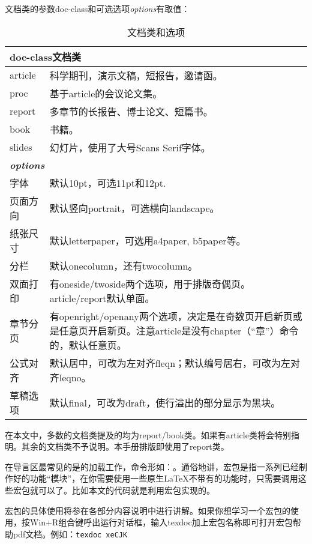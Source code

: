 文档类的参数doc-class和可选选项{\textit{options}}有取值：
\begin{table}[!htb]
    \centering
	\caption{文档类和选项}
	\label{tab:documentclass}
	\begin{tabular}{p{5em} @{\ -\ } p{24em}}
		\hline
		\multicolumn{2}{l}{\bfseries doc-class文档类\footnotemark} \\
		\hline
		article   & 科学期刊，演示文稿，短报告，邀请函。\\
		proc      & 基于article的会议论文集。\\
		report    & 多章节的长报告、博士论文、短篇书。\\
		book      & 书籍。\\
		slides    & 幻灯片，使用了大号Scans Serif字体。\\
		\hline
		\multicolumn{2}{l}{\bfseries\itshape options} \\
		\hline
		字体     & 默认10pt，可选11pt和12pt.\\
		页面方向 & 默认竖向portrait，可选横向landscape。\\
		纸张尺寸 & 默认letterpaper，可选用a4paper, b5paper等。\\
		分栏     & 默认onecolumn，还有twocolumn。\\
		双面打印 & 有oneside/twoside两个选项，用于排版奇偶页。article/report默认单面。\\
		章节分页 & 有openright/openany两个选项，决定是在奇数页开启新页或是任意页开启新页。注意article是没有chapter（``章''）命令的，默认任意页。\\
		公式对齐 & 默认居中，可改为左对齐fleqn；默认编号居右，可改为左对齐leqno。\\
		草稿选项 & 默认final，可改为draft，使行溢出的部分显示为黑块。\\
		\hline
	\end{tabular}
\end{table}

在本文中，多数的文档类提及的均为report/book类。如果有article类将会特别指明。其余的文档类不予说明。本手册排版即使用了report类。\dpar

在导言区最常见的是的加载工作，命令形如：。通俗地讲，宏包是指一系列已经制作好的功能``模块''，在你需要使用一些原生\LaTeX 不带有的功能时，只需要调用这些宏包就可以了。比如本文的代码就是利用宏包实现的。

宏包的具体使用将参在各部分内容说明中进行讲解。如果你想学习一个宏包的使用，按Win+R组合键呼出运行对话框，输入texdoc加上宏包名称即可打开宏包帮助pdf文档。例如：\verb|texdoc xeCJK|

